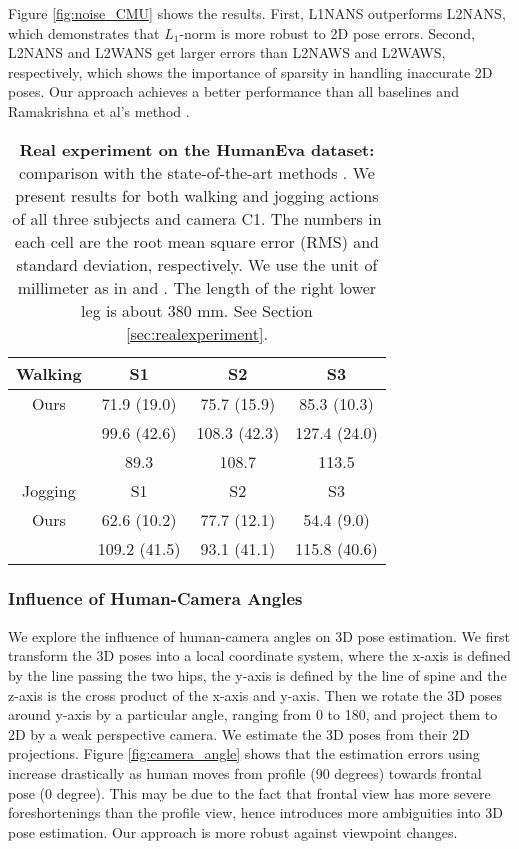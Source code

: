 \documentclass[10pt,twocolumn,letterpaper]{article}
\begin{document}
Figure \ref{fig:noise_CMU} shows the results. First, L1NANS
outperforms L2NANS, which demonstrates that $L_1$-norm is more
robust to 2D pose errors. Second, L2NANS and L2WANS get larger
errors than L2NAWS and L2WAWS, respectively, which shows the
importance of sparsity in handling inaccurate 2D poses. Our
approach achieves a better performance than all baselines and
Ramakrishna et al's method \cite{Ramakrishna}.

\begin{table}
\caption{\textbf{Real experiment on the HumanEva dataset:}
comparison with the state-of-the-art methods
\cite{SimoSerraCVPR2012} \cite{Daubney}. We present results for
both walking and jogging actions of all three subjects and camera
C1. The numbers in each cell are the root mean square error (RMS)
and standard deviation, respectively. We use the unit of
millimeter as in \cite{SimoSerraCVPR2012} and \cite{Daubney}. The
length of the right lower leg is about $380$ mm. See Section
\ref{sec:realexperiment}.} \centering
\begin{tabular}{|c|c|c|c|}
\hline
Walking & S1 & S2 & S3 \\
\hline
Ours & 71.9 (19.0) & 75.7 (15.9) & 85.3 (10.3) \\
\hline
\cite{SimoSerraCVPR2012} & 99.6 (42.6) & 108.3 (42.3) & 127.4 (24.0) \\
\hline
\cite{Daubney} & 89.3 & 108.7 & 113.5 \\
\hline

\hline
\hline
Jogging & S1 & S2 & S3 \\
\hline
Ours & 62.6 (10.2) & 77.7 (12.1) & 54.4 (9.0) \\
\hline
\cite{SimoSerraCVPR2012} & 109.2 (41.5) & 93.1 (41.1) & 115.8 (40.6) \\
\hline
\end{tabular}
\label{table:stateofart}
\end{table}



\subsubsection{Influence of Human-Camera Angles}
\label{sec:humancamera} We explore the influence of human-camera
angles on 3D pose estimation. We first transform
the 3D poses into a local coordinate system, where the x-axis is
defined by the line passing the two hips, the y-axis is defined by
the line of spine and the z-axis is the cross product of the
x-axis and y-axis. Then we rotate the 3D poses around y-axis by a
particular angle, ranging from 0 to 180, and project them to 2D by a weak perspective camera. We estimate the 3D poses
from their 2D projections. Figure \ref{fig:camera_angle} shows
that the estimation errors using \cite{Ramakrishna} increase
drastically as human moves from profile (90 degrees) towards
frontal pose (0 degree). This may be due to the fact that frontal view has more severe foreshortenings than the profile view, hence introduces more ambiguities into 3D pose estimation. Our approach is more
robust against viewpoint changes.
\end{document}
